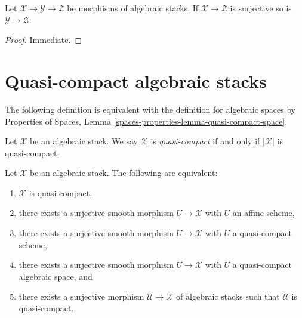 \begin{lemma}
\label{lemma-surjective-permanence}
Let $\mathcal{X} \to \mathcal{Y} \to \mathcal{Z}$ be morphisms of
algebraic stacks. If $\mathcal{X} \to \mathcal{Z}$ is surjective
so is $\mathcal{Y} \to \mathcal{Z}$.
\end{lemma}

\begin{proof}
Immediate.
\end{proof}












\section{Quasi-compact algebraic stacks}
\label{section-quasi-compact}

\noindent
The following definition is equivalent with the definition for algebraic
spaces by
Properties of Spaces, Lemma \ref{spaces-properties-lemma-quasi-compact-space}.

\begin{definition}
\label{definition-quasi-compact}
Let $\mathcal{X}$ be an algebraic stack.
We say $\mathcal{X}$ is {\it quasi-compact}
if and only if $|\mathcal{X}|$ is quasi-compact.
\end{definition}

\begin{lemma}
\label{lemma-quasi-compact-stack}
Let $\mathcal{X}$ be an algebraic stack.
The following are equivalent:
\begin{enumerate}
\item $\mathcal{X}$ is quasi-compact,
\item there exists a surjective smooth morphism $U \to \mathcal{X}$
with $U$ an affine scheme,
\item there exists a surjective smooth morphism $U \to \mathcal{X}$
with $U$ a quasi-compact scheme,
\item there exists a surjective smooth morphism $U \to \mathcal{X}$
with $U$ a quasi-compact algebraic space, and
\item there exists a surjective morphism $\mathcal{U} \to \mathcal{X}$
of algebraic stacks such that $\mathcal{U}$ is quasi-compact.
\end{enumerate}
\end{lemma}

